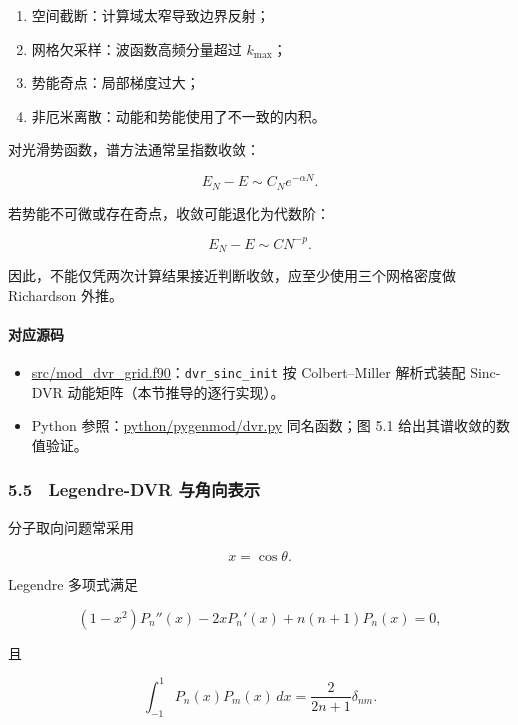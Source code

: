\documentclass[
]{ctexbook}
\providecommand{\tightlist}{%
  \setlength{\itemsep}{0pt}\setlength{\parskip}{0pt}}
\begin{document}
\begin{enumerate}
\def\labelenumi{\arabic{enumi}.}
\tightlist
\item
  空间截断：计算域太窄导致边界反射；
\item
  网格欠采样：波函数高频分量超过 \(k_{\max}\)；
\item
  势能奇点：局部梯度过大；
\item
  非厄米离散：动能和势能使用了不一致的内积。
\end{enumerate}

对光滑势函数，谱方法通常呈指数收敛：

\[
E_N-E\sim C_Ne^{-\alpha N}.
\]

若势能不可微或存在奇点，收敛可能退化为代数阶：

\[
E_N-E\sim CN^{-p}.
\]

因此，不能仅凭两次计算结果接近判断收敛，应至少使用三个网格密度做
Richardson 外推。

\hypertarget{ux5bf9ux5e94ux6e90ux7801-7}{%
\paragraph{对应源码}\label{ux5bf9ux5e94ux6e90ux7801-7}}

\begin{itemize}
\tightlist
\item
  \href{https://github.com/l1Ha/QuantumGeneralModule/blob/main/src/mod_dvr_grid.f90}{src/mod\_dvr\_grid.f90}：\texttt{dvr\_sinc\_init}
  按 Colbert--Miller 解析式装配 Sinc-DVR
  动能矩阵（本节推导的逐行实现）。
\item
  Python
  参照：\href{https://github.com/l1Ha/QuantumGeneralModule/blob/main/python/pygenmod/dvr.py}{python/pygenmod/dvr.py}
  同名函数；图 5.1 给出其谱收敛的数值验证。
\end{itemize}

\hypertarget{legendre-dvr-ux4e0eux89d2ux5411ux8868ux793a}{%
\subsubsection{5.5　Legendre-DVR
与角向表示}\label{legendre-dvr-ux4e0eux89d2ux5411ux8868ux793a}}

分子取向问题常采用

\[
x=\cos\theta.
\]

Legendre 多项式满足

\[
(1-x^2)P_n''(x)-2xP_n'(x)+n(n+1)P_n(x)=0,
\]

且

\[
\int_{-1}^{1}P_n(x)P_m(x)\,dx
=
\frac{2}{2n+1}\delta_{nm}.
\]
\end{document}
